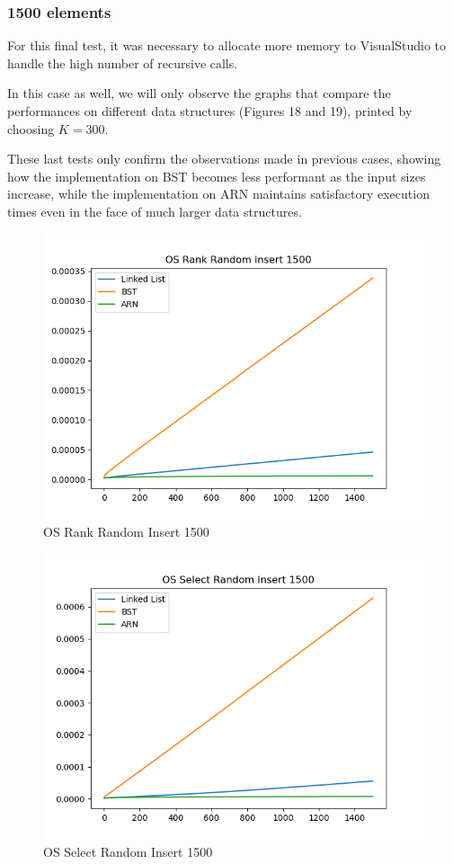 \documentclass[11pt]{article}
\begin{document}
\subsubsection{1500 elements}
For this final test, it was necessary to allocate more memory to VisualStudio to handle the high number of recursive calls.

In this case as well, we will only observe the graphs that compare the performances on different data structures (Figures 18 and 19), printed by choosing $K = 300$.

These last tests only confirm the observations made in previous cases, showing how the implementation on BST becomes less performant as the input sizes increase, while the implementation on ARN maintains satisfactory execution times even in the face of much larger data structures.
 \begin{figure}[H]
  \centering
  \includegraphics[width=0.8\linewidth]{Images/1500/OS Rank Random Insert 1500.png}
  \caption{OS Rank Random Insert 1500 }
  \label{fig:OS Rank Random Insert 1500}
\end{figure}
 \begin{figure}[H]
  \centering
  \includegraphics[width=0.8\linewidth]{Images/1500/OS Select Random Insert 1500.png}
  \caption{OS Select Random Insert 1500 }
  \label{fig:OS Select Random Insert 1500}
\end{figure}
\end{document}
